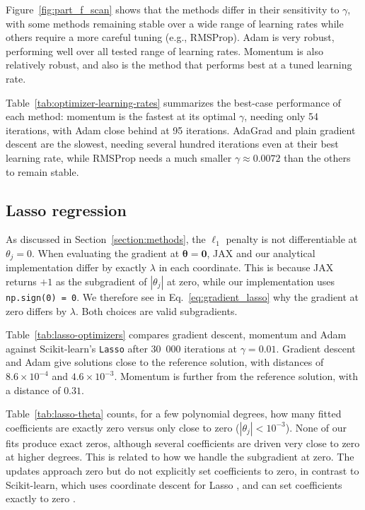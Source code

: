 \documentclass[amssymb,twocolumn,aps]{revtex4}
\begin{document}
Figure~\ref{fig:part_f_scan} shows that the methods differ in their sensitivity to $\gamma$, with some methods remaining stable over a wide range of learning rates while others require a more careful tuning (e.g., RMSProp). Adam is very robust, performing well over all tested range of learning rates. Momentum is also relatively robust, and also is the method that performs best at a tuned learning rate.



Table~\ref{tab:optimizer-learning-rates} summarizes the best-case performance of each method: momentum is the fastest at its optimal $\gamma$, needing only 54 iterations, with Adam close behind at 95 iterations. AdaGrad and plain gradient descent are the slowest, needing several hundred iterations even at their best learning rate, while RMSProp needs a much smaller $\gamma\approx0.0072$ than the others to remain stable.


\subsection{Lasso regression}

As discussed in Section~\ref{section:methods}, the $\ell_1$ penalty is not differentiable at $\theta_j=0$. When evaluating the gradient at $\boldsymbol{\theta}=\boldsymbol{0}$, JAX and our analytical implementation differ by exactly $\lambda$ in each coordinate. This is because JAX returns $+1$ as the subgradient of $|\theta_j|$ at zero, while our implementation uses {\texttt{np.sign(0) = 0}}. We therefore see in Eq.~\eqref{eq:gradient_lasso} why the gradient at zero differs by $\lambda$. Both choices are valid subgradients.



Table~\ref{tab:lasso-optimizers} compares gradient descent, momentum and Adam against Scikit-learn's \texttt{Lasso} after 30~000 iterations at $\gamma=0.01$. Gradient descent and Adam give solutions close to the reference solution, with distances of $8.6\times10^{-4}$ and $4.6\times10^{-3}$. Momentum is further from the reference solution, with a distance of $0.31$.




Table~\ref{tab:lasso-theta} counts, for a few polynomial degrees, how many fitted coefficients are exactly zero versus only close to zero ($|\theta_j|<10^{-3}$). None of our fits produce exact zeros, although several coefficients are driven very close to zero at higher degrees. This is related to how we handle the subgradient at zero. The updates approach zero but do not explicitly set coefficients to zero, in contrast to Scikit-learn, which uses coordinate descent for Lasso \cite{scikitlasso}, and can set coefficients exactly to zero \cite{lecturebook}.
\end{document}
